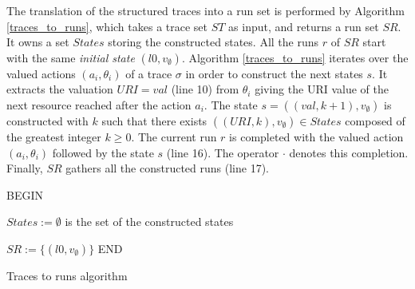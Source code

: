 The translation of the structured traces into a run set is
performed by Algorithm \ref{traces_to_runs}, which takes a
trace set $ST$ as input, and returns a run set $SR$. It owns a
set $States$ storing the constructed states. All the runs $r$ of
$SR$ start with the same \emph{initial state} $(l0,v_\emptyset)$.
Algorithm \ref{traces_to_runs} iterates over the valued actions
$(a_i,\theta_i)$ of a trace $\sigma$ in order to construct the
next states $s$. It extracts the valuation $URI=val$ (line 10) from
$\theta_i$ giving the URI value of the next resource reached
after the action $a_i$. The state $s=((val,k+1),v_\emptyset)$ is
constructed with $k$ such that there exists
$((URI,k),v_\emptyset) \in States$ composed of the greatest
integer $k \geq 0$. The current run $r$ is completed with the
valued action $(a_i,\theta_i)$ followed by the state $s$ (line
16). The operator $\cdot$ denotes this completion. Finally, $SR$
gathers all the constructed runs (line 17).

\begin{algorithm}
 


BEGIN\;

$States:=\emptyset$ is the set of the constructed states\;

 {
    $SR:= \{(l0,v_\emptyset)\}$}\;
END\;

    \caption{Traces to runs algorithm}
    \label{traces_to_runs}
\end{algorithm}

